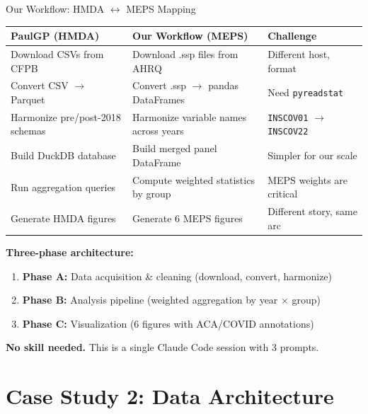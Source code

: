 \documentclass[10pt,english,aspectratio=169]{beamer}
\begin{document}
\begin{frame}{Our Workflow: HMDA $\leftrightarrow$ MEPS Mapping}

\begin{small}
\begin{tabular}{p{4.5cm}p{5cm}p{3.5cm}}
\toprule
\textbf{PaulGP (HMDA)} & \textbf{Our Workflow (MEPS)} & \textbf{Challenge} \\
\midrule
Download CSVs from CFPB & Download .ssp files from AHRQ & Different host, format \\
Convert CSV $\to$ Parquet & Convert .ssp $\to$ pandas DataFrames & Need \texttt{pyreadstat} \\
Harmonize pre/post-2018 schemas & Harmonize variable names across years & \texttt{INSCOV01} $\to$ \texttt{INSCOV22} \\
Build DuckDB database & Build merged panel DataFrame & Simpler for our scale \\
Run aggregation queries & Compute weighted statistics by group & MEPS weights are critical \\
Generate HMDA figures & Generate 6 MEPS figures & Different story, same arc \\
\bottomrule
\end{tabular}
\end{small}

\vspace{0.4cm}
\textbf{Three-phase architecture:}
\begin{enumerate}
    \item \textbf{Phase A:} Data acquisition \& cleaning (download, convert, harmonize)
    \item \textbf{Phase B:} Analysis pipeline (weighted aggregation by year $\times$ group)
    \item \textbf{Phase C:} Visualization (6 figures with ACA/COVID annotations)
\end{enumerate}

\vspace{0.2cm}
\textbf{No skill needed.} This is a single Claude Code session with 3 prompts.

\end{frame}


\section{Case Study 2: Data Architecture}
\end{document}

